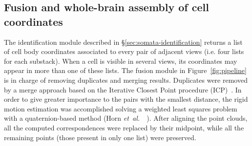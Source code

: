 \documentclass[smallextended]{svjour3}       %
\newcommand{\etal}{\mbox{\emph{et al.\ }}}
\begin{document}
\subsection{Fusion and whole-brain assembly of cell coordinates}
\label{sec:fusion-assembly}
The identification module described in \S\ref{sec:somata-identification}
returns a list of cell body coordinates associated to every pair of adjacent views (i.e. four lists for each substack).
When a cell is visible in several views, its coordinates
may appear in more than one of these lists. The fusion module in
Figure~\ref{fig:pipeline} is in charge of removing duplicates and
merging results. Duplicates were removed by a merge approach based on
the Iterative Closest Point procedure (ICP)~\cite{Simon:1996:FAS:927342}. In order to give greater importance to
the pairs with the smallest distance, the rigid motion estimation was
accomplished solving a weighted least squares problem with a
quaternion-based method (Horn
\etal~\cite{Horn88closed-formsolution}). After aligning the point
clouds, all the computed correspondences were replaced by their
midpoint, while all the remaining points (those present in only one
list) were preserved.
\end{document}
